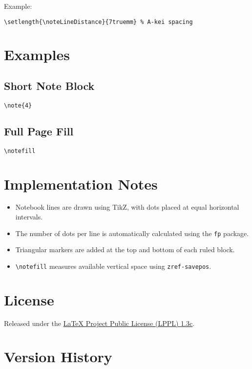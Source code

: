\documentclass[a4paper,12pt]{article}
\begin{document}
Example:
\begin{verbatim}
\setlength{\noteLineDistance}{7truemm} % A-kei spacing
\end{verbatim}

\section{Examples}

\subsection{Short Note Block}
\begin{verbatim}
\note{4}
\end{verbatim}

\subsection{Full Page Fill}
\begin{verbatim}
\notefill
\end{verbatim}
\notefill

\newpage\section{Implementation Notes}

\begin{itemize}
    \item Notebook lines are drawn using TikZ, with dots placed at equal horizontal intervals.
    \item The number of dots per line is automatically calculated using the \texttt{fp} package.
    \item Triangular markers are added at the top and bottom of each ruled block.
    \item \texttt{\textbackslash notefill} measures available vertical space using \texttt{zref-savepos}.
\end{itemize}

\section{License}

Released under the \href{https://www.latex-project.org/lppl/}{LaTeX Project Public License (LPPL) 1.3c}.

\section{Version History}
\end{document}
